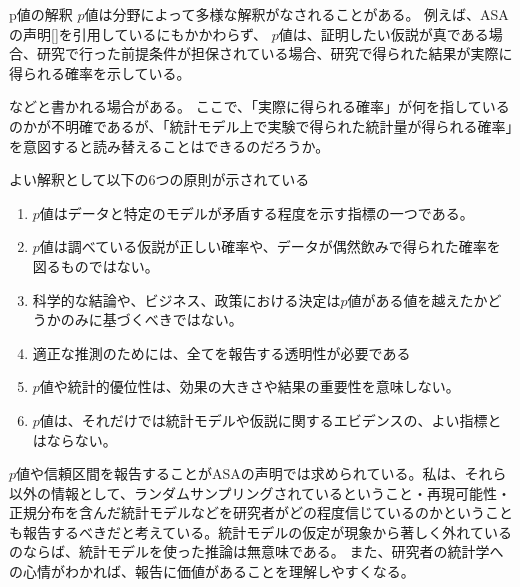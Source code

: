 \begin{SMbox}{p値の解釈}
$p$値は分野によって多様な解釈がなされることがある\cite{published_papers/18436201,2020医療統計解析使いこなし実践ガイド}。
例えば、ASAの声明[\cite{ASA_JA}]を引用しているにもかかわらず、
$p$値は、証明したい仮説が真である場合、研究で行った前提条件が担保されている場合、研究で得られた結果が実際に得られる確率を示している\cite{2020医療統計解析使いこなし実践ガイド}。

などと書かれる場合がある。
ここで、「実際に得られる確率」が何を指しているのかが不明確であるが、「統計モデル上で実験で得られた統計量が得られる確率」を意図すると読み替えることはできるのだろうか。
\fi

よい解釈として以下の6つの原則が示されている\cite{published_papers/18436201}
\begin{enumerate}
    \item $p$値はデータと特定のモデルが矛盾する程度を示す指標の一つである。
    \item $p$値は調べている仮説が正しい確率や、データが偶然飲みで得られた確率を図るものではない。
    \item 科学的な結論や、ビジネス、政策における決定は$p$値がある値を越えたかどうかのみに基づくべきではない。
    \item 適正な推測のためには、全てを報告する透明性が必要である
    \item $p$値や統計的優位性は、効果の大きさや結果の重要性を意味しない。
    \item $p$値は、それだけでは統計モデルや仮説に関するエビデンスの、よい指標とはならない。
\end{enumerate}

    $p$値や信頼区間を報告することがASAの声明では求められている。私は、それら以外の情報として、ランダムサンプリングされているということ・再現可能性・正規分布を含んだ統計モデルなどを研究者がどの程度信じているのかということも報告するべきだと考えている。統計モデルの仮定が現象から著しく外れているのならば、統計モデルを使った推論は無意味である。
    また、研究者の統計学への心情がわかれば、報告に価値があることを理解しやすくなる。
\fi 
\end{SMbox}
